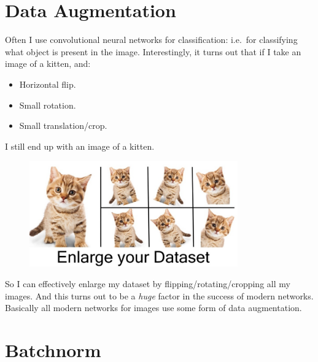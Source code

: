 \documentclass{article}
\begin{document}
\FloatBarrier
\clearpage
\section{Data Augmentation}
Often I use convolutional neural networks for classification: i.e.\ for classifying what object is present in the image.
Interestingly, it turns out that if I take an image of a kitten, and:
\begin{itemize}
  \item Horizontal flip.
  \item Small rotation.
  \item Small translation/crop.
\end{itemize}
I still end up with an image of a kitten.
\begin{figure}[H]
  \centering
  \includegraphics[width=0.8\textwidth]{data_augmentation}
\end{figure}
So I can effectively enlarge my dataset by flipping/rotating/cropping all my images.
And this turns out to be a \textit{huge} factor in the success of modern networks.
Basically all modern networks for images use some form of data augmentation.




\FloatBarrier
\clearpage
\section{Batchnorm}
\end{document}
